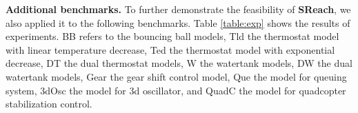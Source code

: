 \begin{comment}

\subsection{Application to the stabilization control of quadcopters}

\textit{Model Description}.
We modeled the stabilization control of a quadcopter, and are interested in analyzing its robustness. In other words, given an arbitrary initial location and position, this model will guarantee that the quadcopter will soon become stable via adjusting velocities of four rotors. To specify the arbitrary initial status, we introduced 6 random variables: ($x_0$, $y_0$, $z_0$) (the initial location),  $\phi_0$ (the initial roll angle), $\theta_0$ (the initial pitch angle), and $\psi_0$ (the initial yaw angle).

\textit{Experiments and Results}. To validate this model, {\bf SReach} was adopted with the BIFT statistical testing option.  

\end{comment}

{\noindent\bf Additional benchmarks.} To further demonstrate the feasibility of {\bf SReach}, we also applied it to the following benchmarks. 
Table \ref{table:exp} shows the results of experiments. BB refers to the bouncing ball models, 
Tld the thermostat model with linear temperature decrease, Ted the thermostat model with exponential decrease, 
DT the dual thermostat models, W the watertank models, DW the dual watertank models, Gear the gear shift control 
model, Que the model for queuing system, 3dOsc the model for 3d oscillator, and QuadC the model for quadcopter 
stabilization control. 


